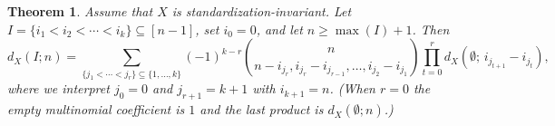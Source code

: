 \documentclass[12pt]{amsart}
\newtheorem{theorem}{Theorem}[section]
\newtheorem{corollary}[theorem]{Corollary}
\theoremstyle{definition}
\theoremstyle{remark}
\begin{document}




\begin{theorem}\label{thm:recursive}
Assume that $X$ is standardization-invariant.
Let $I=\{i_1<i_2<\cdots<i_k\}\subseteq[n-1]$, set $i_0=0$, and let $n\ge \max(I)+1$.
Then
\begin{equation}\label{eq:IE-expanded}
d_X(I;n)
=
\sum_{\{j_1<\cdots<j_r\}\subseteq\{1,\dots,k\}}
(-1)^{k-r}
\binom{n}{n-i_{j_r},i_{j_r}-i_{j_{r-1}},\ldots,i_{j_2}-i_{j_1}}
\prod_{t=0}^{r} d_X\!\left(\emptyset;\,i_{j_{t+1}}-i_{j_t}\right),
\end{equation}
where we interpret $j_0=0$ and $j_{r+1}=k+1$ with $i_{k+1}=n$.
(When $r=0$ the empty multinomial coefficient is $1$ and the last product is $d_X(\emptyset;n)$.)
\end{theorem}
\end{document}
